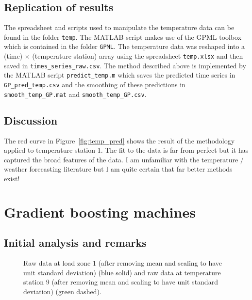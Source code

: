 \documentclass[final,authoryear,1p,times]{elsarticle}
\begin{document}
\subsection{Replication of results}

The spreadsheet and scripts used to manipulate the temperature data can be found in the folder \texttt{temp}.
The MATLAB script makes use of the GPML toolbox which is contained in the folder \texttt{GPML}.
The temperature data was reshaped into a (time) $\times$ (temperature station) array using the spreadsheet \texttt{temp.xlsx} and then saved in \texttt{times\_series\_raw.csv}.
The method described above is implemented by the MATLAB script \texttt{predict\_temp.m} which saves the predicted time series in \texttt{GP\_pred\_temp.csv} and the smoothing of these predictions in \texttt{smooth\_temp\_GP.mat} and \texttt{smooth\_temp\_GP.csv}.

\subsection{Discussion}

The red curve in Figure~\ref{fig:temp_pred} shows the result of the methodology applied to temperature station 1.
The fit to the data is far from perfect but it has captured the broad features of the data.
I am unfamiliar with the temperature / weather forecasting literature but I am quite certain that far better methods exist!

\section{Gradient boosting machines}

\label{sec:gbm}

\subsection{Initial analysis and remarks}

\label{sec:gbm_init_anal}

\begin{figure}[ht]
  \begin{center}
    
  \end{center}
  \caption{Raw data at load zone 1 (after removing mean and scaling to have unit standard deviation) (blue solid) and raw data at temperature station 9 (after removing mean and scaling to have unit standard deviation) (green dashed).}
  \label{fig:load_temp}
\end{figure}
\end{document}
